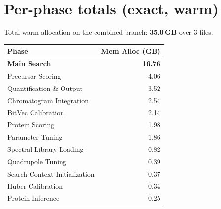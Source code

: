 \documentclass[11pt]{article}
\begin{document}
\section{Per-phase totals (exact, warm)}
Total warm allocation on the combined branch: \textbf{35.0\,GB} over 3 files.
\begin{center}
\begin{tabular}{lr}
\toprule
Phase & Mem Alloc (GB) \\
\midrule
\textbf{Main Search}            & \textbf{16.76} \\
Precursor Scoring               & 4.06 \\
Quantification \& Output        & 3.52 \\
Chromatogram Integration        & 2.54 \\
BitVec Calibration              & 2.14 \\
Protein Scoring                 & 1.98 \\
Parameter Tuning                & 1.86 \\
Spectral Library Loading        & 0.82 \\
Quadrupole Tuning               & 0.39 \\
Search Context Initialization   & 0.37 \\
Huber Calibration               & 0.34 \\
Protein Inference               & 0.25 \\
\bottomrule
\end{tabular}
\end{center}
\end{document}
